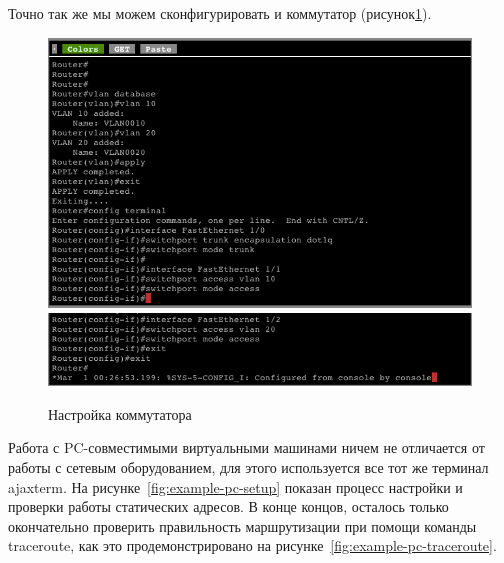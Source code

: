 Точно так же мы можем сконфигурировать и коммутатор (рисунок\ref{fig:example-switch-setup}).
\begin{figure}
  \centering
  \includegraphics[width=14cm]{fig/example-switch-setup-1.png}
  \includegraphics[width=14cm]{fig/example-switch-setup-2.png}
  \caption{Настройка коммутатора}
  \label{fig:example-switch-setup}
\end{figure}

Работа с PC-совместимыми виртуальными машинами ничем не отличается от работы с сетевым оборудованием, для этого
используется все тот же терминал ajaxterm. На рисунке~\ref{fig:example-pc-setup} показан процесс настройки и проверки работы
статических адресов. В конце концов, осталось только окончательно проверить правильность маршрутизации при помощи команды 
traceroute, как это продемонстрировано на рисунке~\ref{fig:example-pc-traceroute}.

